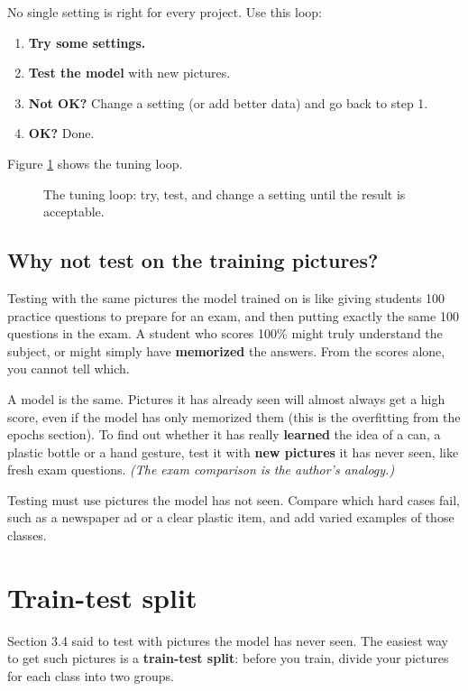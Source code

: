 No single setting is right for every project. Use this loop:


\begin{enumerate}
\item \textbf{Try some settings.}
\item \textbf{Test the model} with new pictures.
\item \textbf{Not OK?} Change a setting (or add better data) and go back to step 1.
\item \textbf{OK?} Done.
\end{enumerate}

Figure \ref{fig:tuning-loop} shows the tuning loop.


\begin{figure}[htbp]
\centering
{}
\caption{The tuning loop: try, test, and change a setting until the result is acceptable.}\label{fig:tuning-loop}
\end{figure}

\subsection*{Why not test on the training pictures?}

Testing with the same pictures the model trained on is like giving students 100 practice questions to prepare for an exam, and then putting exactly the same 100 questions in the exam. A student who scores 100\% might truly understand the subject, or might simply have \textbf{memorized} the answers. From the scores alone, you cannot tell which.


A model is the same. Pictures it has already seen will almost always get a high score, even if the model has only memorized them (this is the overfitting from the epochs section). To find out whether it has really \textbf{learned} the idea of a can, a plastic bottle or a hand gesture, test it with \textbf{new pictures} it has never seen, like fresh exam questions. \emph{(The exam comparison is the author’s analogy.)}


Testing must use pictures the model has not seen. Compare which hard cases fail, such as a newspaper ad or a clear plastic item, and add varied examples of those classes.


\section{Train-test split}

Section 3.4 said to test with pictures the model has never seen. The easiest way to get such pictures is a \textbf{train-test split}: before you train, divide your pictures for each class into two groups.


